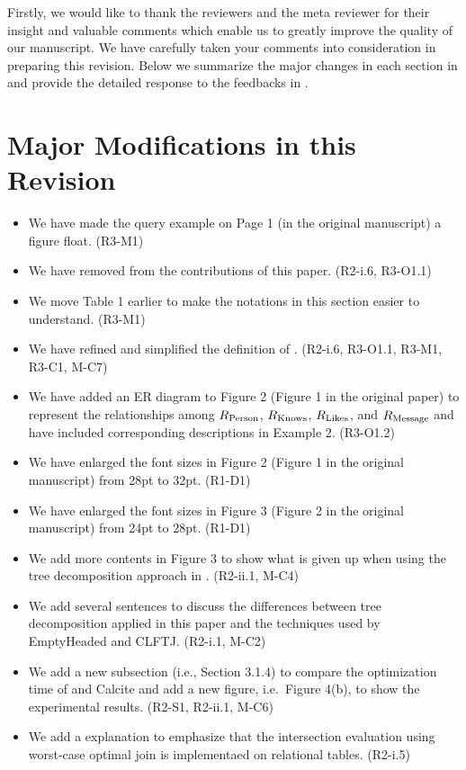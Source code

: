 Firstly, we would like to thank the reviewers and the meta reviewer for their insight and valuable comments which enable us to greatly improve the quality of our manuscript. We have carefully taken your comments into consideration in preparing this revision.
Below we summarize the major changes in each section in  and provide the detailed response to the feedbacks in .


\section{Major Modifications in this Revision}
\label{sec:modifications}

\begin{itemize}
	\item We have made the query example on Page 1 (in the original manuscript) a figure float. (R3-M1)
	\item We have removed \rgmapping from the contributions of this paper. (R2-i.6, R3-O1.1)
\end{itemize}

\begin{itemize}
	\item We move Table 1 earlier to make the notations in this section easier to understand. (R3-M1)
	\item We have refined and simplified the definition of \rgmapping. (R2-i.6, R3-O1.1, R3-M1, R3-C1, M-C7)
	\item We have added an ER diagram to Figure 2 (Figure 1 in the original paper) to represent the relationships among ${R_{\text{Person}}}$,  ${R_{\text{Knows}}}$, ${R_{\text{Likes}}}$, and ${R_{\text{Message}}}$ and have included corresponding descriptions in Example 2. (R3-O1.2)
	\item We have enlarged the font sizes in Figure 2 (Figure 1 in the original manuscript) from 28pt to 32pt. (R1-D1)
\end{itemize}

\begin{itemize}
	\item We have enlarged the font sizes in Figure 3 (Figure 2 in the original manuscript) from 24pt to 28pt. (R1-D1)
	\item We add more contents in Figure 3 to show what is given up when using the tree decomposition approach in \name. (R2-ii.1, M-C4)
	\item We add several sentences to discuss the differences between tree decomposition applied in this paper and the techniques used by EmptyHeaded and CLFTJ. (R2-i.1, M-C2)
	\item We add a new subsection (i.e., Section 3.1.4) to compare the optimization time of \name and Calcite and add a new figure, i.e.~Figure 4(b), to show the experimental results. (R2-S1, R2-ii.1, M-C6)
	\item We add a explanation to emphasize that the intersection evaluation using worst-case optimal join is implementaed on relational tables. (R2-i.5)
\end{itemize}

